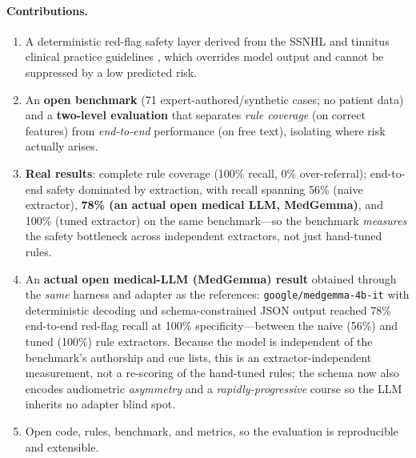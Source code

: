 \documentclass[11pt]{article}
\begin{document}
\paragraph{Contributions.}
\begin{enumerate}[leftmargin=1.5em,itemsep=1pt]
\item A deterministic red-flag safety layer derived from the SSNHL and tinnitus clinical practice guidelines \cite{chandrasekhar2019ssnhl,tunkel2014cpg}, which overrides model output and cannot be suppressed by a low predicted risk.
\item An \textbf{open benchmark} (71 expert-authored/synthetic cases; no patient data) and a \textbf{two-level evaluation} that separates \emph{rule coverage} (on correct features) from \emph{end-to-end} performance (on free text), isolating where risk actually arises.
\item \textbf{Real results}: complete rule coverage (100\% recall, 0\% over-referral); end-to-end safety dominated by extraction, with recall spanning 56\% (naive extractor), \textbf{78\% (an actual open medical LLM, MedGemma)}, and 100\% (tuned extractor) on the same benchmark---so the benchmark \emph{measures} the safety bottleneck across independent extractors, not just hand-tuned rules.
\item An \textbf{actual open medical-LLM (MedGemma) result} obtained through the \emph{same} harness and adapter as the references: \texttt{google/medgemma-4b-it} with deterministic decoding and schema-constrained JSON output reached 78\% end-to-end red-flag recall at 100\% specificity---between the naive (56\%) and tuned (100\%) rule extractors. Because the model is independent of the benchmark's authorship and cue lists, this is an extractor-independent measurement, not a re-scoring of the hand-tuned rules; the schema now also encodes audiometric \emph{asymmetry} and a \emph{rapidly-progressive} course so the LLM inherits no adapter blind spot.
\item Open code, rules, benchmark, and metrics, so the evaluation is reproducible and extensible.
\end{enumerate}
\end{document}
